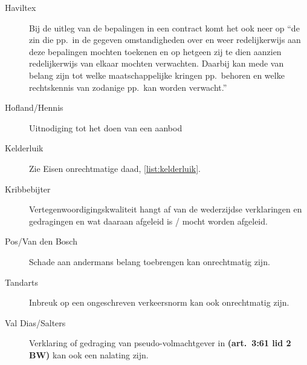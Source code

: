 \documentclass[a4paper]{article}
\newcommand{\art}[1]{\textbf{(art.~#1 BW)}\xspace}
\begin{document}
\begin{description}

  \item[Haviltex] Bij de uitleg van de bepalingen in een contract komt het ook
    neer op ``de zin die pp.~in de gegeven omstandigheden over en weer
    redelijkerwijs aan deze bepalingen mochten toekenen en op hetgeen zij te
    dien aanzien redelijkerwijs van elkaar mochten verwachten. Daarbij kan
    mede van belang zijn tot welke maatschappelijke kringen pp.~behoren en
    welke rechtskennis van zodanige pp.~kan worden verwacht.''

  \item[Hofland/Hennis] Uitnodiging tot het doen van een aanbod

  \item[Kelderluik] Zie Eisen onrechtmatige daad, \ref{list:kelderluik}.

  \item[Kribbebijter] Vertegenwoordigingskwaliteit hangt af van de wederzijdse
    verklaringen en gedragingen en wat daaraan afgeleid is / mocht worden
    afgeleid.

  \item[Pos/Van den Bosch] Schade aan andermans belang toebrengen kan
    onrechtmatig zijn.

  \item[Tandarts] Inbreuk op een ongeschreven verkeersnorm kan ook
    onrechtmatig zijn.

  \item[Val Dias/Salters] Verklaring of gedraging van pseudo-volmachtgever in
    \art{3:61 lid 2} kan ook een nalating zijn.

\end{description}
\end{document}
